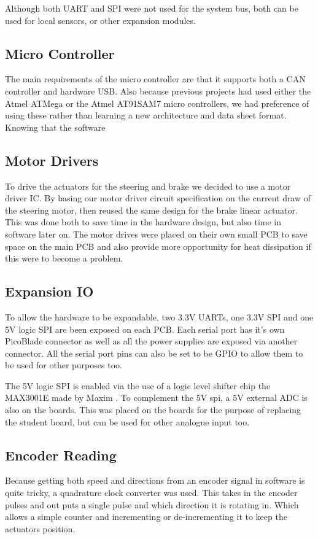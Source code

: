   Although both UART and SPI were not used for the system bus, both can be used
  for local sensors, or other expansion modules.

  \subsection{Micro Controller}
  The main requirements of the micro controller are that it supports both a CAN
  controller and hardware USB. Also because previous projects had used either
  the Atmel ATMega or the Atmel AT91SAM7 micro controllers, we had preference
  of using these rather than learning a new architecture and data sheet format.
  Knowing that the software 

  \subsection{Motor Drivers}
  To drive the actuators for the steering and brake we decided to use a motor
  driver IC. By basing our motor driver circuit specification on the current
  draw of the steering motor, then reused the same design for the brake linear
  actuator. This was done both to save time in the hardware design, but also
  time in software later on. The motor drives were placed on their own small PCB
  to save space on the main PCB and also provide more opportunity for heat
  dissipation if this were to become a problem. 

  \subsection{Expansion IO}
  To allow the hardware to be expandable, two 3.3V UARTs, one 3.3V SPI and
  one 5V logic SPI are been exposed on each PCB. Each serial port has it's own
  PicoBlade connector\cite{PicoBlade} as well as all the power supplies are
  exposed via another connector. All the serial port pins can also be set to be
  GPIO to allow them to be used for other purposes too.

  The 5V logic SPI is enabled via the use of a logic level shifter chip
  the MAX3001E made by Maxim \cite{MAX3001E}. To complement the 5V spi, a 5V
  external ADC is also on the boards. This was placed on the boards for the
  purpose of replacing the student board, but can be used for other analogue
  input too.

  \subsection{Encoder Reading}
  Because getting both speed and directions from an encoder signal in software
  is quite tricky, a quadrature clock converter was used. This takes in the
  encoder pulses and out puts a single pulse and which direction it is rotating
  in. Which allows a simple counter and incrementing or de-incrementing it to
  keep the actuators position.

